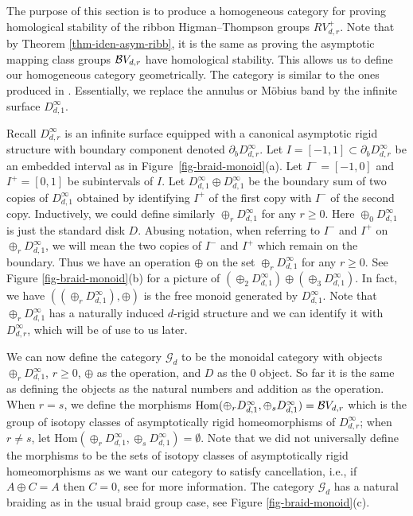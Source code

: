 \documentclass[11pt, a4paper]{amsart}
\theoremstyle{definition}
\newcommand{\CG}{{\mathcal {G}}} \newcommand{\CH}{{\mathcal {H}}}
\newcommand{\Hom}{{\mathrm{Hom}}} \renewcommand{\Im}{{\mathrm{Im}}}
\begin{document}
The purpose of this section is to produce a homogeneous category for proving homological stability of the ribbon Higman--Thompson groups $RV^+_{d,r}$.  Note that by Theorem \ref{thm-iden-asym-ribb}, it is the same as proving the asymptotic mapping class groups $ {\mathcal {B}} V_{d,r}$  have homological stability. This allows us to define our homogeneous category geometrically. The category is similar to the ones produced in \cite[Section 5.6]{RWW17}. Essentially, we replace the annulus or M\"obius band by the infinite surface $D^{\infty}_{d,1}$.

Recall $D^{\infty}_{d,r}$ is an infinite surface equipped with a canonical asymptotic rigid structure with boundary component denoted $\partial_b D^{\infty}_{d,r}$. Let $I=[-1,1] \subset \partial_b D^{\infty}_{d,r}$ be an embedded interval as in Figure~\ref{fig-braid-monoid}(a). Let $I^- = [-1,0]$ and $I^+ = [0,1]$  be subintervals of $I$. Let $ D^{\infty}_{d,1} \oplus D^{\infty}_{d,1}$ be the boundary sum of two copies of $D^{\infty}_{d,1}$ obtained by identifying $I^+$ of the first copy with $I^-$ of the second copy. Inductively, we could define similarly $\oplus_r D^{\infty}_{d,1}$ for any $r\geq 0$.  Here $\oplus_0 D^{\infty}_{d,1}$ is just the standard disk $D$. Abusing notation, when referring to $I^-$ and $I^+$ on $\oplus_r D^{\infty}_{d,1}$, we will mean the two copies of $I^-$ and $I^+$ which remain on the boundary.  Thus we have an operation $\oplus$ on the set $\oplus_r D^{\infty}_{d,1}$ for any $r\geq 0$. See Figure \ref{fig-braid-monoid}(b) for a picture of $(\oplus_2 D^{\infty}_{d,1}) \oplus (\oplus_3 D^{\infty}_{d,1})$.  In fact, we have $ ((\oplus_r D^{\infty}_{d,1}), \oplus) $ is the free monoid generated by $D^{\infty}_{d,1}$.    Note that $\oplus_r D^{\infty}_{d,1}$ has a naturally induced $d$-rigid structure and we can identify it with $D^{\infty}_{d,r}$, which will be of use to us later.

We can now define the category $\CG_d$ to be the monoidal category with objects $\oplus_r D^{\infty}_{d,1}$, $r\ge 0$, $\oplus$ as the operation, and $D$ as the $0$ object. So far it is the same as defining the objects as the  natural numbers and addition as the operation. When $r=s$, we define the morphisms $\Hom (\oplus_r D^{\infty}_{d,1}, \oplus_s D^{\infty}_{d,1}) = \CB V_{d,r}$  which is the group of isotopy classes of  asymptotically rigid homeomorphisms of $ D^{\infty}_{d,r}$; when $r\neq s$, let $\Hom (\oplus_r D^{\infty}_{d,1}, \oplus_s D^{\infty}_{d,1}) =\emptyset $. Note that we did not universally define the morphisms to be the sets of isotopy classes of asymptotically rigid homeomorphisms as we want our category to satisfy cancellation, i.e., if $A\oplus C = A$ then $C = 0$, see \cite[Remark 1.11]{RWW17} for more information. The category $\CG_d$ has a natural braiding as in the usual braid group case, see Figure \ref{fig-braid-monoid}(c). 
\end{document}
